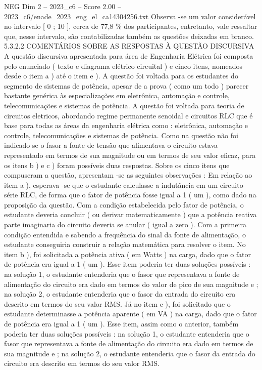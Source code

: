 \begin{textsample}{NEG Dim 2 – 2023\_c6 – Score 2.00 – 2023\_c6/enade\_2023\_eng\_el\_ca14304256.txt}
Observa -se um valor considerável no intervalo [ 0 ; 10 ], cerca de 77,8 \% dos participantes, entretanto, vale ressaltar que, nesse intervalo, são contabilizadas também as questões deixadas em branco. 5.3.2.2 COMENTÁRIOS SOBRE AS RESPOSTAS À QUESTÃO DISCURSIVA A questão discursiva apresentada para área de Engenharia Elétrica foi composta pelo enunciado ( texto e diagrama elétrico circuital ) e cinco itens, nomeados desde o item a ) até o item e ).
A questão foi voltada para os estudantes do segmento de sistemas de potência, apesar de a prova ( como um todo ) parecer bastante genérica às especializações em eletrônica, automação e controle, telecomunicações e sistemas de potência.
A questão foi voltada para teoria de circuitos eletricos, abordando regime permanente senoidal e circuitos RLC que é base para todas as áreas da engenharia elétrica como : eletrônica, automação e controle, telecomunicações e sistemas de potência.
Como na questão não foi indicado se o fasor a fonte de tensão que alimentava o circuito estava representado em termos de sua magnitude ou em termos de seu valor eficaz, para os itens b ) e c ) foram possíveis duas respostas.
Sobre os cinco itens que compuseram a questão, apresentam -se as seguintes observações : Em relação ao item a ), esperava -se que o estudante calculasse a indutância em um circuito série RLC, de forma que o fator de potência fosse igual a 1 ( um ), como dado na proposição da questão.
Com a condição estabelecida pelo fator de potência, o estudante deveria concluir ( ou derivar matematicamente ) que a potência reativa parte imaginaria do circuito deveria se anular ( igual a zero ).
Com a primeira condição entendida e sabendo a frequência do sinal da fonte de alimentação, o estudante conseguiria construir a relação matemática para resolver o item.
No item b ), foi solicitada a potência ativa ( em Watts ) na carga, dado que o fator de potência era igual a 1 ( um ).
Esse item poderia ter duas soluções possíveis : na solução 1, o estudante entenderia que o fasor que representava a fonte de alimentação do circuito era dado em termos do valor de pico de sua magnitude e ; na solução 2, o estudante entenderia que o fasor da entrada do circuito era descrito em termos do seu valor RMS.
Já no item c ), foi solicitado que o estudante determinasse a potência aparente ( em VA ) na carga, dado que o fator de potência era igual a 1 ( um ).
Esse item, assim como o anterior, também poderia ter duas soluções possíveis : na solução 1, o estudante entenderia que o fasor que representava a fonte de alimentação do circuito era dado em termos de sua magnitude e ; na solução 2, o estudante entenderia que o fasor da entrada do circuito era descrito em termos do seu valor RMS.

\end{textsample}
